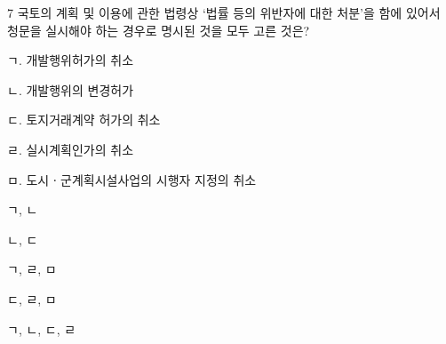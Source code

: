 \begin{question}{7}
국토의 계획 및 이용에 관한 법령상 ‘법률 등의 위반자에 대한 처분’을 함에 있어서 청문을 실시해야 하는 경우로 명시된 것을 모두 고른 것은?
\begin{framedtext}
ㄱ. 개발행위허가의 취소 \par
ㄴ. 개발행위의 변경허가 \par
ㄷ. 토지거래계약 허가의 취소 \par
ㄹ. 실시계획인가의 취소 \par
ㅁ. 도시ㆍ군계획시설사업의 시행자 지정의 취소 \par
\end{framedtext}
\begin{choices}
  \item ㄱ, ㄴ
  \item ㄴ, ㄷ
  \item ㄱ, ㄹ, ㅁ
  \item ㄷ, ㄹ, ㅁ
  \item ㄱ, ㄴ, ㄷ, ㄹ
\end{choices}
\end{question}
